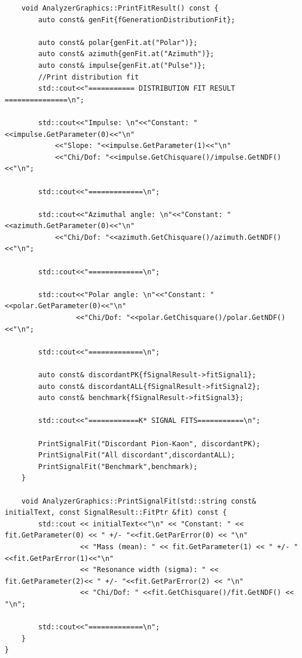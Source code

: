 \documentclass[12pt, a4paper]{article}
\begin{document}
\begin{verbatim}
    void AnalyzerGraphics::PrintFitResult() const {
        auto const& genFit{fGenerationDistributionFit};

        auto const& polar{genFit.at("Polar")};
        auto const& azimuth{genFit.at("Azimuth")};
        auto const& impulse{genFit.at("Pulse")};
        //Print distribution fit
        std::cout<<"=========== DISTRIBUTION FIT RESULT ===============\n";

        std::cout<<"Impulse: \n"<<"Constant: "<<impulse.GetParameter(0)<<"\n"
            <<"Slope: "<<impulse.GetParameter(1)<<"\n"
            <<"Chi/Dof: "<<impulse.GetChisquare()/impulse.GetNDF()<<"\n";

        std::cout<<"=============\n";

        std::cout<<"Azimuthal angle: \n"<<"Constant: "<<azimuth.GetParameter(0)<<"\n"
            <<"Chi/Dof: "<<azimuth.GetChisquare()/azimuth.GetNDF()<<"\n";

        std::cout<<"=============\n";

        std::cout<<"Polar angle: \n"<<"Constant: "<<polar.GetParameter(0)<<"\n"
                 <<"Chi/Dof: "<<polar.GetChisquare()/polar.GetNDF()<<"\n";

        std::cout<<"=============\n";

        auto const& discordantPK{fSignalResult->fitSignal1};
        auto const& discordantALL{fSignalResult->fitSignal2};
        auto const& benchmark{fSignalResult->fitSignal3};

        std::cout<<"============K* SIGNAL FITS===========\n";

        PrintSignalFit("Discordant Pion-Kaon", discordantPK);
        PrintSignalFit("All discordant",discordantALL);
        PrintSignalFit("Benchmark",benchmark);
    }

    void AnalyzerGraphics::PrintSignalFit(std::string const& initialText, const SignalResult::FitPtr &fit) const {
        std::cout << initialText<<"\n" << "Constant: " << fit.GetParameter(0) << " +/- "<<fit.GetParError(0) << "\n"
                  << "Mass (mean): " << fit.GetParameter(1) << " +/- "<<fit.GetParError(1)<<"\n"
                  << "Resonance width (sigma): " << fit.GetParameter(2)<< " +/- "<<fit.GetParError(2) << "\n"
                  << "Chi/Dof: " <<fit.GetChisquare()/fit.GetNDF() << "\n";

        std::cout<<"=============\n";
    }
}

\end{verbatim}
\end{document}
